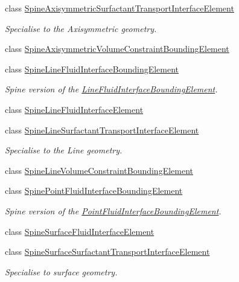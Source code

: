 \begin{DoxyCompactItemize}
class \hyperlink{classoomph_1_1SpineAxisymmetricSurfactantTransportInterfaceElement}{Spine\+Axisymmetric\+Surfactant\+Transport\+Interface\+Element}
\begin{DoxyCompactList}\small\item\em Specialise to the Axisymmetric geometry. \end{DoxyCompactList}\item 
class \hyperlink{classoomph_1_1SpineAxisymmetricVolumeConstraintBoundingElement}{Spine\+Axisymmetric\+Volume\+Constraint\+Bounding\+Element}
\item 
class \hyperlink{classoomph_1_1SpineLineFluidInterfaceBoundingElement}{Spine\+Line\+Fluid\+Interface\+Bounding\+Element}
\begin{DoxyCompactList}\small\item\em Spine version of the \hyperlink{classoomph_1_1LineFluidInterfaceBoundingElement}{Line\+Fluid\+Interface\+Bounding\+Element}. \end{DoxyCompactList}\item 
class \hyperlink{classoomph_1_1SpineLineFluidInterfaceElement}{Spine\+Line\+Fluid\+Interface\+Element}
\item 
class \hyperlink{classoomph_1_1SpineLineSurfactantTransportInterfaceElement}{Spine\+Line\+Surfactant\+Transport\+Interface\+Element}
\begin{DoxyCompactList}\small\item\em Specialise to the Line geometry. \end{DoxyCompactList}\item 
class \hyperlink{classoomph_1_1SpineLineVolumeConstraintBoundingElement}{Spine\+Line\+Volume\+Constraint\+Bounding\+Element}
\item 
class \hyperlink{classoomph_1_1SpinePointFluidInterfaceBoundingElement}{Spine\+Point\+Fluid\+Interface\+Bounding\+Element}
\begin{DoxyCompactList}\small\item\em Spine version of the \hyperlink{classoomph_1_1PointFluidInterfaceBoundingElement}{Point\+Fluid\+Interface\+Bounding\+Element}. \end{DoxyCompactList}\item 
class \hyperlink{classoomph_1_1SpineSurfaceFluidInterfaceElement}{Spine\+Surface\+Fluid\+Interface\+Element}
\item 
class \hyperlink{classoomph_1_1SpineSurfaceSurfactantTransportInterfaceElement}{Spine\+Surface\+Surfactant\+Transport\+Interface\+Element}
\begin{DoxyCompactList}\small\item\em Specialise to surface geometry. \end{DoxyCompactList}\item 

\end{DoxyCompactItemize}
